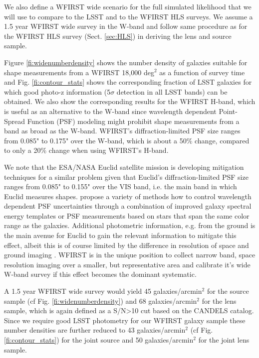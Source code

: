 \documentclass[fleqn,usenatbib,useAMS]{mnras}
\begin{document}
We also define a WFIRST wide scenario for the full simulated likelihood that we will use to compare to the LSST and to the WFIRST HLS surveys. We assume a 1.5 year WFIRST wide survey in the W-band and follow same procedure as for the WFIRST HLS survey (Sect. \ref{sec:HLS}) in deriving the lens and source sample. 

Figure \ref{fi:widenumberdensity} shows the number density of galaxies suitable for shape measurements from a WFIRST 18,000 deg$^2$ as a function of survey time and Fig. \ref{fi:contour_stats} shows the corresponding fraction of LSST galaxies for which good photo-z information (5$ \sigma$ detection in all LSST bands) can be obtained. We also show the corresponding results for the WFIRST H-band, which is useful as an alternative to the W-band since wavelength dependent Point-Spread Function (PSF) modeling might prohibit shape measurements from a band as broad as the W-band. WFIRST's diffraction-limited PSF size ranges from 0.085" to 0.175" over the W-band, which is about a 50\% change, compared to only a 20\% change when using WFIRST's H-band. 

We note that the ESA/NASA Euclid satellite mission is developing mitigation techniques for a similar problem given that Euclid's diffraction-limited PSF size ranges from 0.085" to 0.155" over the VIS band, i.e. the main band in which Euclid measures shapes. \cite{cav10, csl18, erh19} propose a variety of methods how to control wavelength dependent PSF uncertainties through a combination of improved galaxy spectral energy templates or PSF measurements based on stars that span the same color range as the galaxies. Additional photometric information, e.g. from the ground is the main avenue for Euclid to gain the relevant information to mitigate this effect, albeit this is of course limited by the difference in resolution of space and ground imaging \citep[also see][for additional wavelength dependent PSF effects from the atmosphere]{meb15}. WFIRST is in the unique position to collect narrow band, space resolution imaging over a smaller, but representative area and calibrate it's wide W-band survey if this effect becomes the dominant systematic.  

A 1.5 year WFIRST wide survey would yield 45 galaxies/arcmin$^2$ for the source sample (cf Fig. \ref{fi:widenumberdensity}) and 68 galaxies/arcmin$^2$ for the lens sample, which is again defined as a S/N>10 cut based on the CANDELS catalog. Since we require good LSST photometry for our WFIRST galaxy sample these number densities are further reduced to 43 galaxies/arcmin$^2$ (cf Fig. \ref{fi:contour_stats}) for the joint source and 50 galaxies/arcmin$^2$ for the joint lens sample. 
\end{document}
